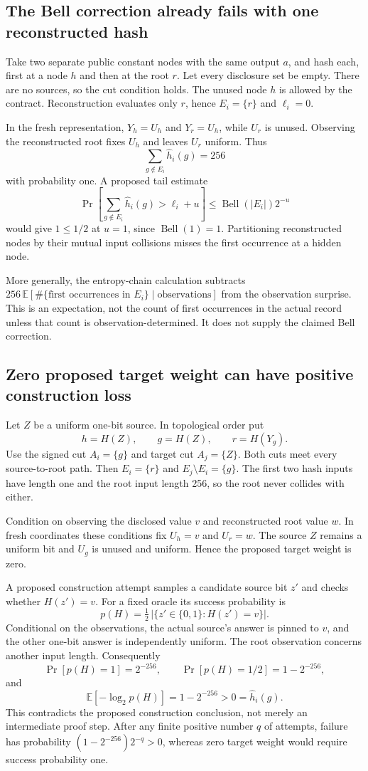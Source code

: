 \documentclass[10pt]{article}
\begin{document}
\subsection{The Bell correction already fails with one reconstructed hash}

Take two separate public constant nodes with the same output $a$, and hash each, first at a node $h$ and then at the root $r$. Let every disclosure set be empty. There are no sources, so the cut condition holds. The unused node $h$ is allowed by the contract. Reconstruction evaluates only $r$, hence $E_i=\{r\}$ and $\ell_i=0$.

In the fresh representation, $Y_h=U_h$ and $Y_r=U_h$, while $U_r$ is unused. Observing the reconstructed root fixes $U_h$ and leaves $U_r$ uniform. Thus
\[
\sum_{g\notin E_i}\widehat h_i(g)=256
\]
with probability one. A proposed tail estimate
\[
\Pr\!\left[\sum_{g\notin E_i}\widehat h_i(g)>\ell_i+u\right]
\le\operatorname{Bell}(|E_i|)2^{-u}
\]
would give $1\le1/2$ at $u=1$, since $\operatorname{Bell}(1)=1$. Partitioning reconstructed nodes by their mutual input collisions misses the first occurrence at a hidden node.

More generally, the entropy-chain calculation subtracts
$256\,\mathbb E[\#\{\text{first occurrences in }E_i\}\mid\text{observations}]$ from the observation surprise. This is an expectation, not the count of first occurrences in the actual record unless that count is observation-determined. It does not supply the claimed Bell correction.

\subsection{Zero proposed target weight can have positive construction loss}

Let $Z$ be a uniform one-bit source. In topological order put
\[
h=H(Z),\qquad g=H(Z),\qquad r=H(Y_g).
\]
Use the signed cut $A_i=\{g\}$ and target cut $A_j=\{Z\}$. Both cuts meet every source-to-root path. Then $E_i=\{r\}$ and $E_j\setminus E_i=\{g\}$. The first two hash inputs have length one and the root input length 256, so the root never collides with either.

Condition on observing the disclosed value $v$ and reconstructed root value $w$. In fresh coordinates these conditions fix $U_h=v$ and $U_r=w$. The source $Z$ remains a uniform bit and $U_g$ is unused and uniform. Hence the proposed target weight is zero.

A proposed construction attempt samples a candidate source bit $z'$ and checks whether $H(z')=v$. For a fixed oracle its success probability is
\[
p(H)=\tfrac12\,|\{z'\in\{0,1\}:H(z')=v\}|.
\]
Conditional on the observations, the actual source's answer is pinned to $v$, and the other one-bit answer is independently uniform. The root observation concerns another input length. Consequently
\[
\Pr[p(H)=1]=2^{-256},\qquad
\Pr[p(H)=1/2]=1-2^{-256},
\]
and
\[
\mathbb E[-\log_2 p(H)]=1-2^{-256}>0=\widehat h_i(g).
\]
This contradicts the proposed construction conclusion, not merely an intermediate proof step. After any finite positive number $q$ of attempts, failure has probability $(1-2^{-256})2^{-q}>0$, whereas zero target weight would require success probability one.
\end{document}
